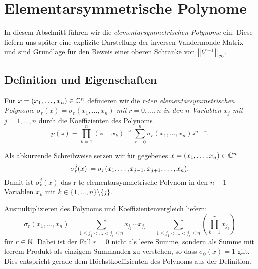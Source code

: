 \chapter{Elementarsymmetrische Polynome}

In diesem Abschnitt führen wir die \emph{elementarsymmetrischen Polynome} ein.
Diese liefern uns später eine explizite Darstellung der inversen
Vandermonde-Matrix und sind Grundlage für den Beweis einer oberen Schranke von
$\left\lVert V^{-1} \right\rVert_\infty$.

\section{Definition und Eigenschaften}

\begin{mydef}
    Für $x = (x_1, \dots, x_{n}) \in \mathbb{C}^n$ definieren wir die
    \emph{r-ten elementarsymmetrischen Polynome
    $\sigma_{r}(x) = \sigma_{r}(x_1, \dots, x_{n})$ mit $r = 0, \dots, n$
    in den $n$ Variablen $x_j$ mit $j = 1, \dots, n$} durch die Koeffizienten
    des Polynoms
    \[
        p(z)
        = \prod_{k=1}^{n} (z + x_k)
        \eqdef \sum_{r=0}^{n} \sigma_{r}(x_1, \dots, x_{n}) z^{n-r}.
    \]
\end{mydef}

\begin{notation}
    Als abkürzende Schreibweise setzen wir für gegebenes
    $x = (x_1, \dots, x_{n}) \in \mathbb{C}^n$
    \[
        \sigma_{r}^{j}(x) \coloneqq \sigma_{r}(x_1, \dots, x_{j-1}, x_{j+1}, \dots, x_{n}).
    \]
    Damit ist $\sigma_{r}^{j}(x)$ das r-te elementarsymmetrische Polynom in den
    $n-1$ Variablen $x_k$ mit $k \in \{ 1, \dots, n \} \setminus \{ j \}$.
\end{notation}

\begin{remark}
    Ausmultiplizieren des Polynoms und Koeffizientenvergleich liefern:
    \begin{equation}
        \label{eq:explicit_elementary_symmetric_polynomials}
        \sigma_{r}(x_1, \dots, x_{n})
        = \sum_{1 \leq j_1 < \dots < j_r \leq n} x_{j_1} \cdots x_{j_r}
        = \sum_{1 \leq j_1 < \dots < j_r \leq n} \left( \prod_{k=1}^r x_{j_k} \right)
    \end{equation}
    für $r \in \mathbb{N}$.
    Dabei ist der Fall $r = 0$ nicht als leere Summe, sondern als Summe mit
    leerem Produkt als einzigem Summanden zu verstehen, so dass
    $\sigma_0(x) = 1$ gilt. Dies entspricht gerade dem Höchstkoeffizienten des
    Polynoms aus der Definition.
\end{remark}

